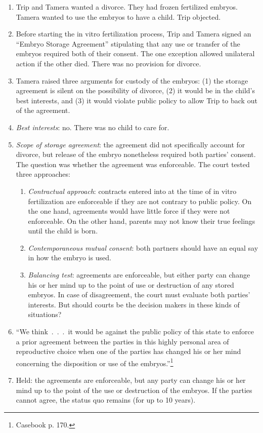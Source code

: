 \begin{enumerate}
    \item Trip and Tamera wanted a divorce. They had frozen fertilized 
    embryos. Tamera wanted to use the embryos to have a child. Trip objected.
    \item Before starting the in vitro fertilization process, Trip and Tamera 
    signed an ``Embryo Storage Agreement'' stipulating that any use or 
    transfer of the embryos required both of their consent. The one exception 
    allowed unilateral action if the other died. There was no provision for 
    divorce.
    \item Tamera raised three arguments for custody of the embryos: (1) the 
    storage agreement is silent on the possibility of divorce, (2) it would be 
    in the child's best interests, and (3) it would violate public policy to 
    allow Trip to back out of the agreement.
    \item \emph{Best interests}: no. There was no child to care for.
    \item \emph{Scope of storage agreement}: the agreement did not 
    specifically account for divorce, but release of the embryo nonetheless 
    required both parties' consent. The question was whether the agreement was 
    enforceable. The court tested three approaches:
    \begin{enumerate}
        \item \emph{Contractual approach}: contracts entered into at the time 
        of in vitro fertilization are enforceable if they are not contrary to 
        public policy. On the one hand, agreements would have little force if 
        they were not enforceable. On the other hand, parents may not know 
        their true feelings until the child is born.
        \item \emph{Contemporaneous mutual consent}: both partners should have 
        an equal say in how the embryo is used.
        \item \emph{Balancing test}: agreements are enforceable, but either 
        party can change his or her mind up to the point of use or destruction 
        of any stored embryos. In case of disagreement, the court must 
        evaluate both parties' interests. But should courts be the decision 
        makers in these kinds of situations?
    \end{enumerate}
    \item ``We think~.~.~.~it would be against the public policy of this state 
    to enforce a prior agreement between the parties in this highly personal 
    area of reproductive choice when one of the parties has changed his or her 
    mind concerning the disposition or use of the embryos.''\footnote{Casebook 
    p. 170.}
    \item Held: the agreements are enforceable, but any party can change his 
    or her mind up to the point of the use or destruction of the embryos. If 
    the parties cannot agree, the status quo remains (for up to 10 years).
\end{enumerate}

